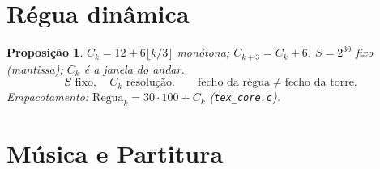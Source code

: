 \documentclass[11pt,a4paper]{article}
\newtheorem{proposicao}{Proposição}
\newcommand{\code}[1]{\texttt{#1}}
\begin{document}
\section{Régua dinâmica}

\begin{proposicao}\label{prop:monotona}
$C_k=12+6\lfloor k/3\rfloor$ monótona; $C_{k+3}=C_k+6$.
$S=2^{30}$ fixo (mantissa); $C_k$ é a janela do andar.
\[
\boxed{S\text{ fixo},\quad C_k\text{ resolução}.}
\qquad
\boxed{\text{fecho da régua}\neq\text{fecho da torre}.}
\]
Empacotamento: $\mathrm{Regua}_k=30\cdot100+C_k$ (\code{tex\_core.c}).
\end{proposicao}

\section{Música e Partitura}\label{sec:musica}
\end{document}
